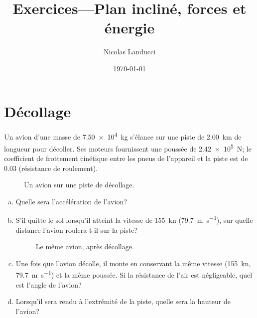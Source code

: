 \documentclass[letterpaper]{article}
\title{Exercices---Plan inclin\'e, forces et \'energie}
\date{\today}
\author{Nicolas Landucci}
\begin{document}
\maketitle

\section{D\'ecollage}
    Un avion d'une masse de \qty{7.50e4}{\kilogram} s'\'elance sur une piste de \qty{2.00}{\kilo\metre} de longueur pour d\'ecoller. Ses moteurs fournissent une pouss\'ee de \qty{2.42e5}{\newton}; le coefficient de frottement cin\'etique entre les pneus de l'appareil et la piste est de \num{0.03} (r\'esistance de roulement).

    \begin{figure}[H]
        \centering
        
        \caption{Un avion sur une piste de d\'ecollage.}
    \end{figure}

    \begin{enumerate}[a)]
    \item
        Quelle sera l'acc\'el\'eration de l'avion?
    \item
        S'il quitte le sol lorsqu'il atteint la vitesse de \qty{155}{\knot} (\qty{79.7}{\metre\per\second}), sur quelle distance l'avion roulera-t-il sur la piste?
        
    \begin{figure}[H]
        \centering
        
        \caption{Le m\^eme avion, apr\`es d\'ecollage.}
    \end{figure}
    \item
        Une fois que l'avion d\'ecolle, il monte en conservant la m\^eme vitesse (\qty{155}{\knot}, \qty{79.7}{\metre\per\second}) et la m\^eme pouss\'ee. Si la r\'esistance de l'air est n\'egligeable, quel est l'angle de l'avion?
    \item
        Lorsqu'il sera rendu \`a l'extr\'emit\'e de la piste, quelle sera la hauteur de l'avion?
    \end{enumerate}
\end{document}
